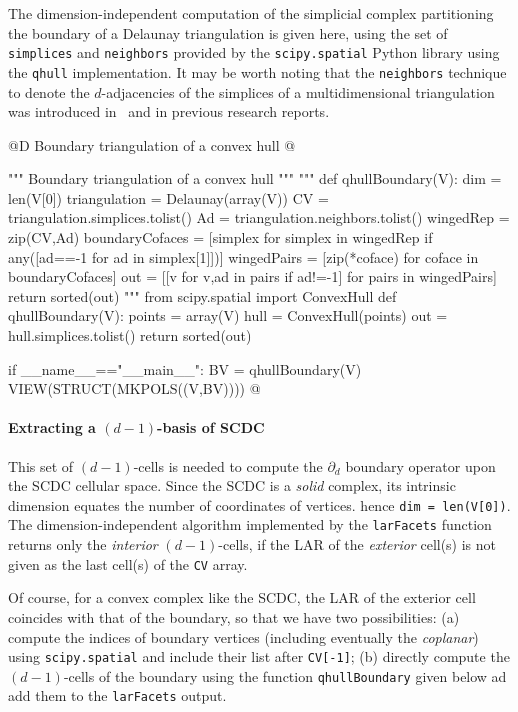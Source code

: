 \documentclass[11pt,oneside]{article}	%
\begin{document}
The dimension-independent computation of the simplicial complex partitioning the boundary of a Delaunay triangulation is given here, using the set of \texttt{simplices} and \texttt{neighbors} provided by the \texttt{scipy.spatial} Python library using the \texttt{qhull} implementation.
It may be worth noting that the \texttt{neighbors} technique to denote the $d$-adjacencies of the simplices of a multidimensional triangulation was introduced in~\cite{DBLP:journals/cad/FerruciP91,Paoluzzi:1993:DMS:169728.169719} and in previous research reports. 

@D Boundary triangulation of a convex hull
@{""" Boundary triangulation of a convex hull """
"""
def qhullBoundary(V):
	dim = len(V[0])
	triangulation = Delaunay(array(V))
	CV = triangulation.simplices.tolist()
	Ad = triangulation.neighbors.tolist()
	wingedRep = zip(CV,Ad)
	boundaryCofaces = [simplex for simplex in wingedRep if any([ad==-1 for ad in simplex[1]])]
	wingedPairs = [zip(*coface) for coface in boundaryCofaces]
	out = [[v for v,ad in pairs if ad!=-1] for pairs in wingedPairs]
	return sorted(out)
"""
from scipy.spatial import ConvexHull
def qhullBoundary(V):
	points = array(V)
	hull = ConvexHull(points)
	out = hull.simplices.tolist()
	return sorted(out)
	
if __name__=="__main__":
	BV = qhullBoundary(V)
	VIEW(STRUCT(MKPOLS((V,BV))))
@}


\paragraph{Extracting a $(d-1)$-basis of SCDC}

This set of $(d-1)$-cells is needed to compute the $\partial_d$ boundary operator upon the SCDC cellular space.
Since the SCDC is a \emph{solid} complex, its intrinsic dimension equates the number of coordinates of vertices.
hence \texttt{dim = len(V[0])}. The dimension-independent algorithm implemented by the \texttt{larFacets} function
returns only the \emph{interior} $(d-1)$-cells, if the LAR of the \emph{exterior} cell(s) is not given as the last cell(s) of the \texttt{CV} array. 

Of course, for a convex complex like the SCDC, the LAR of the exterior cell coincides with that of the boundary, so that we have two possibilities: (a) compute the indices of boundary vertices (including eventually the \emph{coplanar}) using \texttt{scipy.spatial} and include their list after \texttt{CV[-1]}; (b) directly compute the $(d-1)$-cells of the boundary using the function \texttt{qhullBoundary} given below ad add them to the \texttt{larFacets} output. 
\end{document}
